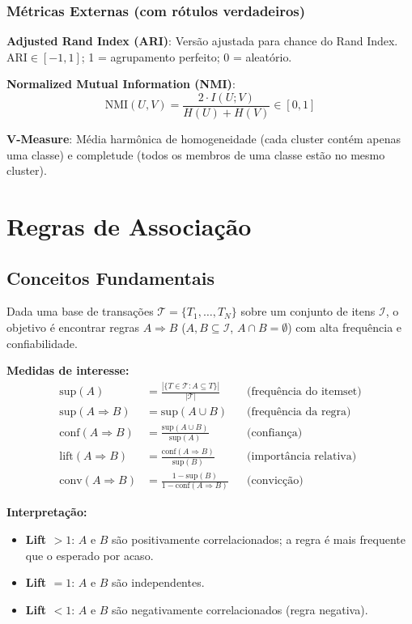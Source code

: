 \documentclass[12pt,a4paper]{article}
\begin{document}
\subsubsection{Métricas Externas (com rótulos verdadeiros)}

\textbf{Adjusted Rand Index (ARI)}: Versão ajustada para chance do Rand Index. $\text{ARI} \in [-1, 1]$; 1 = agrupamento perfeito; 0 = aleatório.

\textbf{Normalized Mutual Information (NMI)}:
\[
  \text{NMI}(U, V) = \frac{2 \cdot I(U; V)}{H(U) + H(V)} \in [0, 1]
\]

\textbf{V-Measure}: Média harmônica de homogeneidade (cada cluster contém apenas uma classe) e completude (todos os membros de uma classe estão no mesmo cluster).

\section{Regras de Associação}

\subsection{Conceitos Fundamentais}

Dada uma base de transações $\mathcal{T} = \{T_1, \ldots, T_N\}$ sobre um conjunto de itens $\mathcal{I}$, o objetivo é encontrar regras $A \Rightarrow B$ ($A, B \subseteq \mathcal{I}$, $A \cap B = \emptyset$) com alta frequência e confiabilidade.

\textbf{Medidas de interesse:}
\begin{align}
  \text{sup}(A) &= \frac{|\{T \in \mathcal{T} : A \subseteq T\}|}{|\mathcal{T}|} && \text{(frequência do itemset)}\\
  \text{sup}(A \Rightarrow B) &= \text{sup}(A \cup B) && \text{(frequência da regra)}\\
  \text{conf}(A \Rightarrow B) &= \frac{\text{sup}(A \cup B)}{\text{sup}(A)} && \text{(confiança)}\\
  \text{lift}(A \Rightarrow B) &= \frac{\text{conf}(A \Rightarrow B)}{\text{sup}(B)} && \text{(importância relativa)}\\
  \text{conv}(A \Rightarrow B) &= \frac{1 - \text{sup}(B)}{1 - \text{conf}(A \Rightarrow B)} && \text{(convicção)}
\end{align}

\textbf{Interpretação:}
\begin{itemize}
  \item \textbf{Lift $> 1$}: $A$ e $B$ são positivamente correlacionados; a regra é mais frequente que o esperado por acaso.
  \item \textbf{Lift $= 1$}: $A$ e $B$ são independentes.
  \item \textbf{Lift $< 1$}: $A$ e $B$ são negativamente correlacionados (regra negativa).
\end{itemize}
\end{document}

